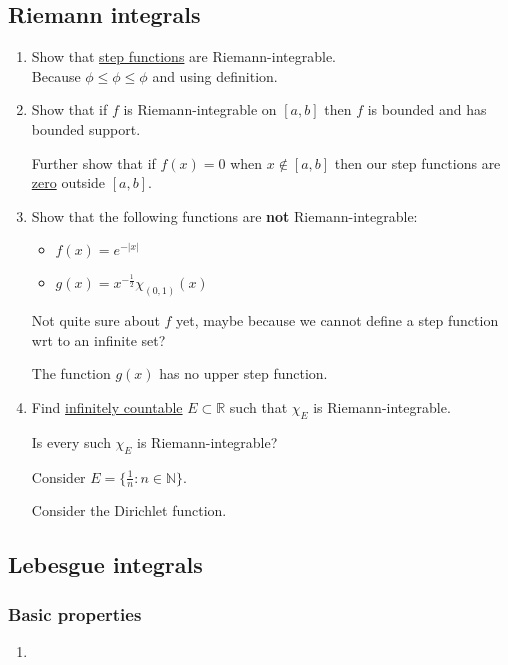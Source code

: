 \subsection{Riemann integrals}
\begin{enumerate}
    \item Show that \underline{step functions}
    are Riemann-integrable. \\

    Because $\phi\leq\phi\leq\phi$ and using definition. \\

    \item Show that if $f$ is Riemann-integrable on $[a,b]$
    then $f$ is bounded and has bounded support.

    Further show that if $f(x)=0$ when $x\notin[a,b]$
    then our step functions are \underline{zero} outside $[a,b]$. \\

    \item Show that the following functions are \textbf{not}
    Riemann-integrable:
    \begin{itemize}
        \item $f(x)=e^{-|x|}$
        \item $g(x)=x^{-\frac{1}{2}}\chi_{(0,1)}(x)$ \\
    \end{itemize}

    Not quite sure about $f$ yet, maybe because we
    cannot define a step function wrt to an infinite set?

    The function $g(x)$ has no upper step function. \\

    \item Find \underline{infinitely countable} $E\subset\mathbb{R}$ such that
    $\chi_E$ is Riemann-integrable.

    Is every such $\chi_E$ is Riemann-integrable?

    Consider $E=\{\frac{1}{n}:n\in\mathbb{N}\}$.

    Consider the Dirichlet function.
\end{enumerate}

\newpage

\subsection{Lebesgue integrals}

\subsubsection{Basic properties}
\begin{enumerate}
    \item 
\end{enumerate}